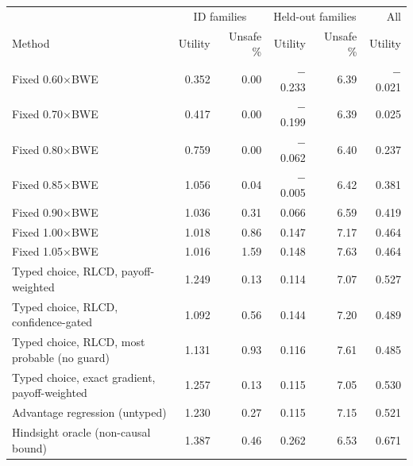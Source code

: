 \begin{tabular}{lrrrrr}
\toprule
 & \multicolumn{2}{c}{ID families} & \multicolumn{2}{c}{Held-out families} & All \\
Method & Utility & Unsafe \% & Utility & Unsafe \% & Utility \\
\midrule
Fixed 0.60$\times$BWE & 0.352 & 0.00 & $-$0.233 & 6.39 & $-$0.021 \\
Fixed 0.70$\times$BWE & 0.417 & 0.00 & $-$0.199 & 6.39 & 0.025 \\
Fixed 0.80$\times$BWE & 0.759 & 0.00 & $-$0.062 & 6.40 & 0.237 \\
Fixed 0.85$\times$BWE & 1.056 & 0.04 & $-$0.005 & 6.42 & 0.381 \\
Fixed 0.90$\times$BWE & 1.036 & 0.31 & 0.066 & 6.59 & 0.419 \\
Fixed 1.00$\times$BWE & 1.018 & 0.86 & 0.147 & 7.17 & 0.464 \\
Fixed 1.05$\times$BWE & 1.016 & 1.59 & 0.148 & 7.63 & 0.464 \\
\midrule
Typed choice, RLCD, payoff-weighted & 1.249 & 0.13 & 0.114 & 7.07 & 0.527 \\
Typed choice, RLCD, confidence-gated & 1.092 & 0.56 & 0.144 & 7.20 & 0.489 \\
Typed choice, RLCD, most probable (no guard) & 1.131 & 0.93 & 0.116 & 7.61 & 0.485 \\
Typed choice, exact gradient, payoff-weighted & 1.257 & 0.13 & 0.115 & 7.05 & 0.530 \\
Advantage regression (untyped) & 1.230 & 0.27 & 0.115 & 7.15 & 0.521 \\
\midrule
Hindsight oracle (non-causal bound) & 1.387 & 0.46 & 0.262 & 6.53 & 0.671 \\
\bottomrule
\end{tabular}
